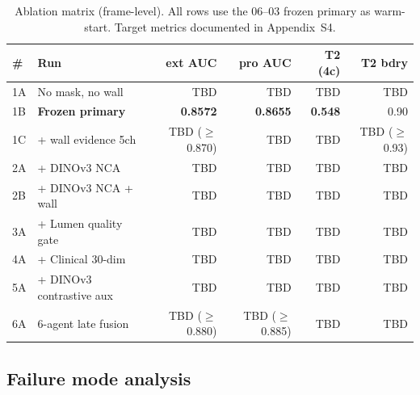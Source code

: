 \documentclass[11pt,a4paper]{article}
\begin{document}
\begin{table}[t]
\caption{Ablation matrix (frame-level). All rows use the 06--03 frozen primary as warm-start. Target metrics documented in Appendix~S4.}
\label{tab:ablation}
\centering
\small
\begin{tabular}{llrrrr}
\toprule
\textbf{\#} & \textbf{Run} & \textbf{ext AUC} & \textbf{pro AUC} & \textbf{T2 (4c)} & \textbf{T2 bdry} \\
\midrule
1A & No mask, no wall           & TBD & TBD & TBD & TBD \\
1B & \textbf{Frozen primary}     & \textbf{0.8572} & \textbf{0.8655} & \textbf{0.548} & 0.90 \\
1C & + wall evidence 5ch         & TBD ($\geq$0.870) & TBD & TBD & TBD ($\geq$0.93) \\
2A & + DINOv3 NCA                & TBD & TBD & TBD & TBD \\
2B & + DINOv3 NCA + wall         & TBD & TBD & TBD & TBD \\
3A & + Lumen quality gate        & TBD & TBD & TBD & TBD \\
4A & + Clinical 30-dim           & TBD & TBD & TBD & TBD \\
5A & + DINOv3 contrastive aux    & TBD & TBD & TBD & TBD \\
6A & 6-agent late fusion         & TBD ($\geq$0.880) & TBD ($\geq$0.885) & TBD & TBD \\
\bottomrule
\end{tabular}
\end{table}

\subsection{Failure mode analysis}
\end{document}
